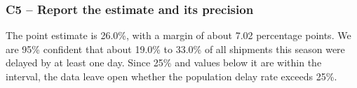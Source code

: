 
	\label{sol:c5-2-b}
	\subsubsection*{C5 -- Report the estimate and its precision}

	The point estimate is 26.0\%, with a margin of about 7.02 percentage points. We are 95\% confident that about 19.0\% to 33.0\% of all shipments this season were delayed by at least one day. Since 25\% and values below it are within the interval, the data leave open whether the population delay rate exceeds 25\%.




